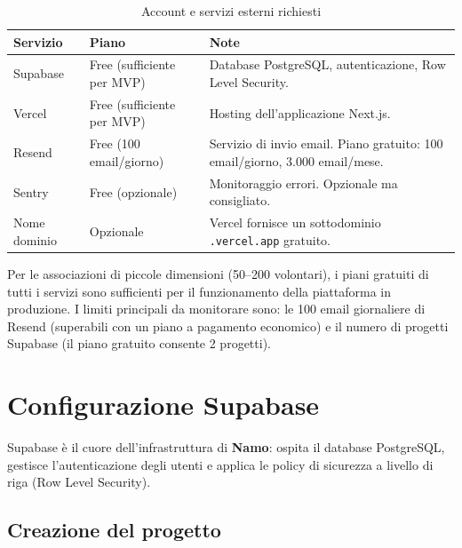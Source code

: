 \documentclass[a4paper,11pt,oneside]{book}
\newcommand{\namo}{\textbf{Namo}}
\begin{document}
\begin{table}[htbp]
\centering
\caption{Account e servizi esterni richiesti}
\label{tab:requisiti-account}
\begin{tabularx}{\textwidth}{l l X}
\toprule
\textbf{Servizio} & \textbf{Piano} & \textbf{Note} \\
\midrule
Supabase      & Free (sufficiente per MVP) & Database PostgreSQL, autenticazione, Row Level Security. \\
Vercel        & Free (sufficiente per MVP) & Hosting dell'applicazione Next.js. \\
Resend        & Free (100 email/giorno)    & Servizio di invio email. Piano gratuito: 100 email/giorno, 3.000 email/mese. \\
Sentry        & Free (opzionale)           & Monitoraggio errori. Opzionale ma consigliato. \\
Nome dominio  & Opzionale                  & Vercel fornisce un sottodominio \texttt{.vercel.app} gratuito. \\
\bottomrule
\end{tabularx}
\end{table}

\begin{tipbox}
Per le associazioni di piccole dimensioni (50--200 volontari), i piani gratuiti di tutti i servizi sono sufficienti per il funzionamento della piattaforma in produzione. I limiti principali da monitorare sono: le 100 email giornaliere di Resend (superabili con un piano a pagamento economico) e il numero di progetti Supabase (il piano gratuito consente 2 progetti).
\end{tipbox}

\section{Configurazione Supabase}
\label{sec:configurazione-supabase}

Supabase \`e il cuore dell'infrastruttura di \namo{}: ospita il database PostgreSQL, gestisce l'autenticazione degli utenti e applica le policy di sicurezza a livello di riga (Row Level Security).

\subsection{Creazione del progetto}
\label{sec:supabase-progetto}
\end{document}
